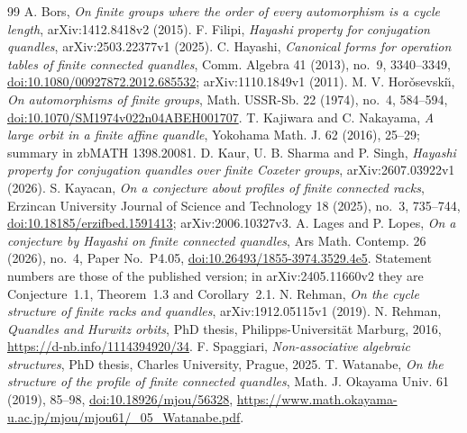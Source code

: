 \documentclass[11pt]{article}
\begin{document}
\begin{thebibliography}{99}
 A. Bors, \emph{On finite groups where the order of every
automorphism is a cycle length}, arXiv:1412.8418v2 (2015).
 F. Filipi, \emph{Hayashi property for conjugation quandles},
arXiv:2503.22377v1 (2025).
 C. Hayashi, \emph{Canonical forms for operation tables of
finite connected quandles}, Comm. Algebra 41 (2013), no.~9, 3340--3349,
\href{https://doi.org/10.1080/00927872.2012.685532}{doi:10.1080/00927872.2012.685532};
arXiv:1110.1849v1 (2011).
 M. V. Hor\v{o}sevski\u{\i}, \emph{On automorphisms of finite
groups}, Math. USSR-Sb. 22 (1974), no.~4, 584--594,
\href{https://doi.org/10.1070/SM1974v022n04ABEH001707}{doi:10.1070/SM1974v022n04ABEH001707}.
 T. Kajiwara and C. Nakayama, \emph{A large orbit in a finite
affine quandle}, Yokohama Math. J. 62 (2016), 25--29; summary in zbMATH
1398.20081.
 D. Kaur, U. B. Sharma and P. Singh, \emph{Hayashi property for
conjugation quandles over finite Coxeter groups}, arXiv:2607.03922v1 (2026).
 S. Kayacan, \emph{On a conjecture about profiles of finite
connected racks}, Erzincan University Journal of Science and Technology 18
(2025), no.~3, 735--744,
\href{https://doi.org/10.18185/erzifbed.1591413}{doi:10.18185/erzifbed.1591413};
arXiv:2006.10327v3.
 A. Lages and P. Lopes, \emph{On a conjecture by Hayashi on
finite connected quandles}, Ars Math. Contemp. 26 (2026), no.~4, Paper
No.~P4.05,
\href{https://doi.org/10.26493/1855-3974.3529.4e5}{doi:10.26493/1855-3974.3529.4e5}.
Statement numbers are those of the published version; in arXiv:2405.11660v2
they are Conjecture~1.1, Theorem~1.3 and Corollary~2.1.
 N. Rehman, \emph{On the cycle structure of finite racks and
quandles}, arXiv:1912.05115v1 (2019).
 N. Rehman, \emph{Quandles and Hurwitz orbits}, PhD thesis,
Philipps-Universit\"at Marburg, 2016,
\url{https://d-nb.info/1114394920/34}.
 F. Spaggiari, \emph{Non-associative algebraic structures}, PhD
thesis, Charles University, Prague, 2025.
 T. Watanabe, \emph{On the structure of the profile of finite
connected quandles}, Math. J. Okayama Univ. 61 (2019), 85--98,
\href{https://doi.org/10.18926/mjou/56328}{doi:10.18926/mjou/56328},
\url{https://www.math.okayama-u.ac.jp/mjou/mjou61/_05_Watanabe.pdf}.
\end{thebibliography}
\end{document}
